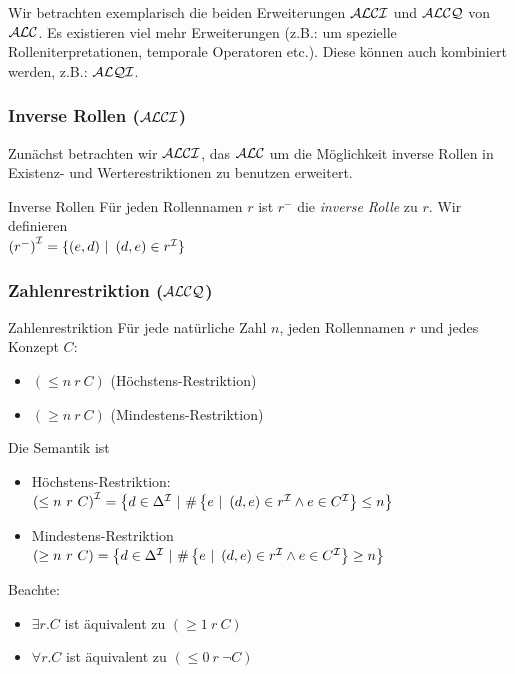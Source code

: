 Wir betrachten exemplarisch die beiden Erweiterungen $\mathcal{A}\mathcal{L}\mathcal{C}\mathcal{I}$ und $\mathcal{A}\mathcal{L}\mathcal{C}\mathcal{Q}$ von $\mathcal{A}\mathcal{L}\mathcal{C}$. Es existieren viel mehr Erweiterungen (z.B.: um spezielle Rolleniterpretationen, temporale Operatoren etc.). Diese können auch kombiniert werden, z.B.: $\mathcal{A}\mathcal{L}\mathcal{Q}\mathcal{I}$.

\subsubsection{Inverse Rollen ($\mathcal{A}\mathcal{L}\mathcal{C}\mathcal{I}$)}\label{inverse-rollen-alci}

Zunächst betrachten wir $\mathcal{A}\mathcal{L}\mathcal{C}\mathcal{I}$, das $\mathcal{A}\mathcal{L}\mathcal{C}$ um die Möglichkeit inverse Rollen in Existenz- und Werterestriktionen zu benutzen erweitert.

\begin{definition}{Inverse Rollen}
Für jeden Rollennamen $r$ ist $r^{-}$ die \emph{inverse
Rolle} zu $r$. Wir definieren \\
$\left( r^{-} \right)^{\mathcal{I}} = \left\{ \left( e,d \right)\  \right|\ \left( d,e \right) \in r^{\mathcal{I}}\}$
\end{definition}

\subsubsection{Zahlenrestriktion ($\mathcal{A}\mathcal{L}\mathcal{C}\mathcal{Q}$)}\label{zahlenrestriktion-alcq}

\begin{definition}{Zahlenrestriktion}
Für jede natürliche Zahl $n$, jeden Rollennamen $r$ und
jedes Konzept $C$:

\begin{itemize}
  \item $\left( \leq n\ r\ C \right)$ (Höchstens-Restriktion)
  \item $\left( \geq n\ r\ C \right)$ (Mindestens-Restriktion)
\end{itemize}

Die Semantik ist
\begin{itemize}
\item
  Höchstens-Restriktion:
  $\left( \leq n\ r\ C \right)^{\MI} = \left\{ d \in \Delta^{\MI}\ |\ \#\left\{ e\ |\ \left( d,e \right) \in r^{\MI} \land e \in C^{\MI} \right\} \leq n \right\}$
\item
  Mindestens-Restriktion
  $( \geq n\ r\ C) = \left\{ d \in \Delta^{\mathcal{I}}\ |\ \#\left\{ e\ |\ \left( d,e \right) \in r^{\mathcal{I}} \land e \in C^{\mathcal{I}} \right\} \geq n \right\}$
\end{itemize}
\end{definition}

Beachte:

\begin{itemize}
  \item $\exists r.C$ ist äquivalent zu $(\geq 1\ r\ C)$
  \item $\forall r.C$ ist äquivalent zu $(\leq 0\ r\ \neg C)$
\end{itemize}